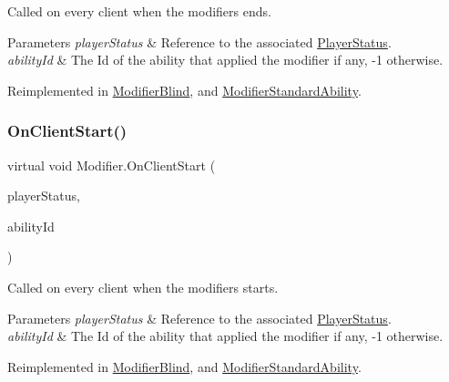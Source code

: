 Called on every client when the modifiers ends. 


\begin{DoxyParams}{Parameters}
{\em player\+Status} & Reference to the associated \hyperlink{class_player_status}{Player\+Status}.\\
\hline
{\em ability\+Id} & The Id of the ability that applied the modifier if any, -\/1 otherwise.\\
\hline
\end{DoxyParams}


Reimplemented in \hyperlink{class_modifier_blind_a4423072654e3eeafc3f12475e3d6c56d}{Modifier\+Blind}, and \hyperlink{class_modifier_standard_ability_a46000f6d2262a1436d1826774d7a0f59}{Modifier\+Standard\+Ability}.

\hypertarget{class_modifier_a90f173bd4674843a683769f46520273b}{}\label{class_modifier_a90f173bd4674843a683769f46520273b} 
\subsubsection{\texorpdfstring{On\+Client\+Start()}{OnClientStart()}}
{\footnotesize\ttfamily virtual void Modifier.\+On\+Client\+Start (\begin{DoxyParamCaption}\item[{\hyperlink{class_player_status}{Player\+Status}}]{player\+Status,  }\item[{int}]{ability\+Id }\end{DoxyParamCaption})\hspace{0.3cm}{\ttfamily [virtual]}}



Called on every client when the modifiers starts. 


\begin{DoxyParams}{Parameters}
{\em player\+Status} & Reference to the associated \hyperlink{class_player_status}{Player\+Status}.\\
\hline
{\em ability\+Id} & The Id of the ability that applied the modifier if any, -\/1 otherwise.\\
\hline
\end{DoxyParams}


Reimplemented in \hyperlink{class_modifier_blind_a8cfcbe75907fe9a029b76fedb581ddae}{Modifier\+Blind}, and \hyperlink{class_modifier_standard_ability_a92fa22504144748d8f3fc6df932da9c1}{Modifier\+Standard\+Ability}.

